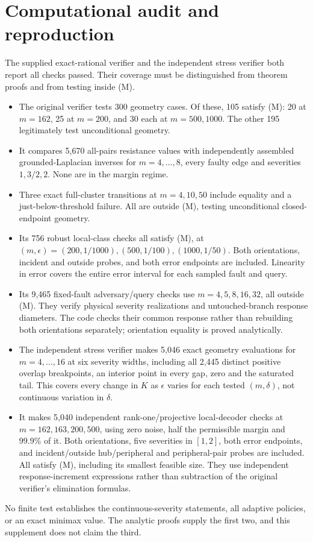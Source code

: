 \documentclass[11pt,letterpaper]{article}
\begin{document}
\section{Computational audit and reproduction}
The supplied exact-rational verifier and the independent stress verifier both report all checks passed. Their coverage must be distinguished from theorem proofs and from testing inside (M).
\begin{itemize}
\item The original verifier tests 300 geometry cases. Of these, 105 satisfy (M): 20 at $m=162$, 25 at $m=200$, and 30 each at $m=500,1000$. The other 195 legitimately test unconditional geometry.
\item It compares 5,670 all-pairs resistance values with independently assembled grounded-Laplacian inverses for $m=4,\ldots,8$, every faulty edge and severities $1,3/2,2$. None are in the margin regime.
\item Three exact full-cluster transitions at $m=4,10,50$ include equality and a just-below-threshold failure. All are outside (M), testing unconditional closed-endpoint geometry.
\item Its 756 robust local-class checks all satisfy (M), at $(m,\epsilon)=(200,1/1000),(500,1/100),(1000,1/50)$. Both orientations, incident and outside probes, and both error endpoints are included. Linearity in error covers the entire error interval for each sampled fault and query.
\item Its 9,465 fixed-fault adversary/query checks use $m=4,5,8,16,32$, all outside (M). They verify physical severity realizations and untouched-branch response diameters. The code checks their common response rather than rebuilding both orientations separately; orientation equality is proved analytically.
\item The independent stress verifier makes 5,046 exact geometry evaluations for $m=4,\ldots,16$ at six severity widths, including all 2,445 distinct positive overlap breakpoints, an interior point in every gap, zero and the saturated tail. This covers every change in $K$ as $\epsilon$ varies for each tested $(m,\delta)$, not continuous variation in $\delta$.
\item It makes 5,040 independent rank-one/projective local-decoder checks at $m=162,163,200,500$, using zero noise, half the permissible margin and 99.9\% of it. Both orientations, five severities in $[1,2]$, both error endpoints, and incident/outside hub/peripheral and peripheral-pair probes are included. All satisfy (M), including its smallest feasible size. They use independent response-increment expressions rather than subtraction of the original verifier's elimination formulas.
\end{itemize}
No finite test establishes the continuous-severity statements, all adaptive policies, or an exact minimax value. The analytic proofs supply the first two, and this supplement does not claim the third.
\end{document}
